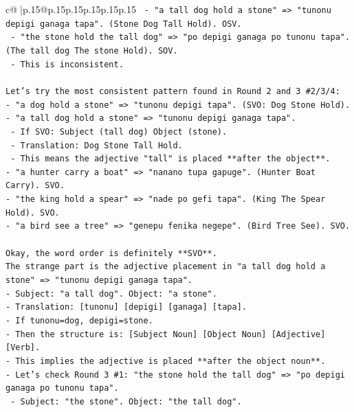 \documentclass{article}
\begin{document}
{\begin{supertabular}{c@{$\;$}|p{.15\linewidth}@{}p{.15\linewidth}p{.15\linewidth}p{.15\linewidth}p{.15\linewidth}p{.15\linewidth}}
{{{\texttt{    {-} "a tall dog hold a stone" => "tunonu depigi ganaga tapa". (Stone Dog Tall Hold). OSV.} \\
\texttt{    {-} "the stone hold the tall dog" => "po depigi ganaga po tunonu tapa". (The tall dog The stone Hold). SOV.} \\
\texttt{    {-} This is inconsistent.} \\
\\ 
\texttt{Let's try the most consistent pattern found in Round 2 and 3 \#2/3/4:} \\
\texttt{{-} "a dog hold a stone" => "tunonu depigi tapa". (SVO: Dog Stone Hold).} \\
\texttt{{-} "a tall dog hold a stone" => "tunonu depigi ganaga tapa".} \\
\texttt{  {-} If SVO: Subject (tall dog) Object (stone).} \\
\texttt{  {-} Translation: Dog Stone Tall Hold.} \\
\texttt{  {-} This means the adjective "tall" is placed **after the object**.} \\
\texttt{{-} "a hunter carry a boat" => "nanano tupa gapuge". (Hunter Boat Carry). SVO.} \\
\texttt{{-} "the king hold a spear" => "nade po gefi tapa". (King The Spear Hold). SVO.} \\
\texttt{{-} "a bird see a tree" => "genepu fenika negepe". (Bird Tree See). SVO.} \\
\\ 
\texttt{Okay, the word order is definitely **SVO**.} \\
\texttt{The strange part is the adjective placement in "a tall dog hold a stone" => "tunonu depigi ganaga tapa".} \\
\texttt{{-} Subject: "a tall dog". Object: "a stone".} \\
\texttt{{-} Translation: {[}tunonu{]} {[}depigi{]} {[}ganaga{]} {[}tapa{]}.} \\
\texttt{{-} If tunonu=dog, depigi=stone.} \\
\texttt{{-} Then the structure is: {[}Subject Noun{]} {[}Object Noun{]} {[}Adjective{]} {[}Verb{]}.} \\
\texttt{{-} This implies the adjective is placed **after the object noun**.} \\
\texttt{{-} Let's check Round 3 \#1: "the stone hold the tall dog" => "po depigi ganaga po tunonu tapa".} \\
\texttt{  {-} Subject: "the stone". Object: "the tall dog".} \\
}}}
\end{supertabular}}
\end{document}
